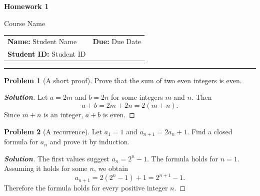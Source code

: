\documentclass[11pt,a4paper]{article}
\makeatletter
\newcommand{\coursename}{Course Name}
\newcommand{\assignmentname}{Homework 1}
\newcommand{\studentname}{Student Name}
\newcommand{\studentid}{Student ID}
\newcommand{\duedate}{Due Date}
\newcommand{\makehomeworktitle}{%
  \begin{center}
    {\LARGE\bfseries\color{Ink}\assignmentname\par}
    \vspace{0.35em}
    {\large\color{Muted}\coursename\par}
  \end{center}
  \vspace{1em}
  \begin{tabular*}{\textwidth}{@{\extracolsep{\fill}}ll}
    \textbf{Name:} \studentname & \textbf{Due:} \duedate \\
    \textbf{Student ID:} \studentid & \\
  \end{tabular*}
  \vspace{0.5em}
  \hrule
  \vspace{1.4em}
}
\theoremstyle{definition}
\newtheorem{problem}{Problem}
\newenvironment{solution}[1][Solution]
  {\begin{proof}[\textbf{#1}]}
  {\end{proof}}
\makeatother
\begin{document}
\makehomeworktitle

\begin{problem}[A short proof]
  Prove that the sum of two even integers is even.
\end{problem}

\begin{solution}
  Let $a=2m$ and $b=2n$ for some integers $m$ and $n$. Then
  \[
    a+b=2m+2n=2(m+n).
  \]
  Since $m+n$ is an integer, $a+b$ is even.
\end{solution}

\begin{problem}[A recurrence]
  Let $a_1=1$ and $a_{n+1}=2a_n+1$. Find a closed formula for $a_n$ and
  prove it by induction.
\end{problem}

\begin{solution}
  The first values suggest $a_n=2^n-1$. The formula holds for $n=1$.
  Assuming it holds for some $n$, we obtain
  \[
    a_{n+1}=2(2^n-1)+1=2^{n+1}-1.
  \]
  Therefore the formula holds for every positive integer $n$.
\end{solution}
\end{document}
